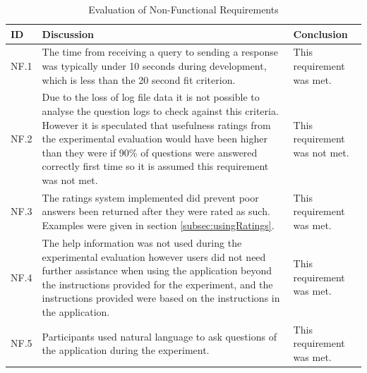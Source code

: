 \documentclass[authoryearcitations]{UoYCSproject}
\begin{document}
\begin{table}[h]
\begin{tabular}{|p{0.7cm}|p{9cm}|p{4.0cm}|}
\hline
ID   & Discussion                                                                                                                                                                                                                                                                                                                                     & Conclusion                    \\ \hline
NF.1 & The time from receiving a query to sending a response was typically under 10 seconds during development, which is less than the 20 second fit criterion.                                                                                                                                                                                       & This requirement was met.     \\ \hline
NF.2 & Due to the loss of log file data it is not possible to analyse the question logs to check against this criteria. However it is speculated that usefulness ratings from the experimental evaluation would have been higher than they were if 90\% of questions were answered correctly first time so it is assumed this requirement was not met. & This requirement was not met. \\ \hline
NF.3 & The ratings system implemented did prevent poor answers been returned after they were rated as such. Examples were given in section \ref{subsec:usingRatings}.                                                                                                                                                                                 & This requirement was met.     \\ \hline
NF.4 & The help information was not used during the experimental evaluation however users did not need further assistance when using the application beyond the instructions provided for the experiment, and the instructions provided were based on the instructions in the application.                                                            & This requirement was met.     \\ \hline
NF.5 & Participants used natural language to ask questions of the application during the experiment.                                                                                                                                                                                                                                                  & This requirement was met.     \\ \hline
\end{tabular}
\caption{Evaluation of Non-Functional Requirements}
\label{table:evalNonFunctionalReqs}
\end{table}
\end{document}
